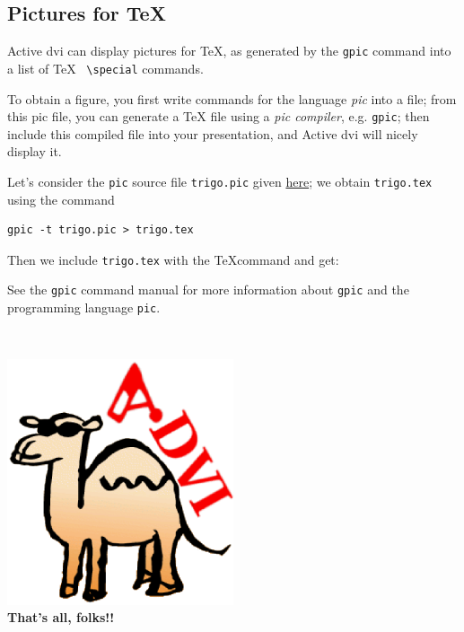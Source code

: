\documentclass[12pt]{article}
\begin{document}
\newpage

\subsection*{Pictures for \TeX}

Active dvi can display pictures for \TeX, as generated by
the \verb"gpic" command into a list of \TeX~ \verb"\special" commands.

\bigskip

To obtain a figure, you first write commands for the language
{\em pic} into a file; from this pic file, you can generate a \TeX
file using a {\em pic compiler}, e.g. \verb"gpic"; then include this
compiled file into your presentation, and Active dvi will nicely display it.

Let's consider the \verb"pic" source file \verb"trigo.pic" given
\hyperref{trigo_source.dvi}{}{}{here}; we obtain
\verb"trigo.tex" using the command 
\begin{verbatim}
gpic -t trigo.pic > trigo.tex
\end{verbatim}

Then we include \verb"trigo.tex" with the \TeX command
\verb|| and get:

\def\showgraph{%
  \par\medskip\centerline{\raise 1em\box\graph}\bigskip\noindent\ignorespaces}



See the \verb"gpic" command manual for more information about
\verb"gpic" and the programming language \verb"pic".

\lastpage

~\vfill
\begin{center}
\includegraphics[width=0.5\textwidth]{../tex/advilogo.eps}\\
{\Large \bf That's all, folks!!}
\end{center}
\vfill
\end{document}
